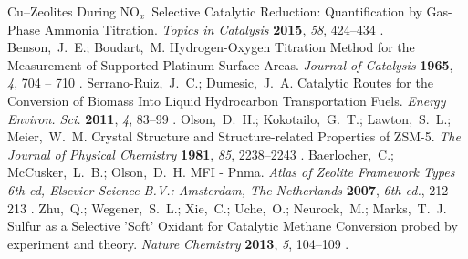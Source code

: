 \documentclass[journal=iecred,manuscript=article]{achemso}
\begin{document}
{\begin{mcitethebibliography}
  Cu--Zeolites During NO$_x$\  Selective Catalytic Reduction: Quantification by
  Gas-Phase Ammonia Titration. \emph{Topics in Catalysis} \textbf{2015},
  \emph{58}, 424--434\relax
\mciteBstWouldAddEndPuncttrue
\mciteSetBstMidEndSepPunct{\mcitedefaultmidpunct}
{\mcitedefaultendpunct}{\mcitedefaultseppunct}\relax
\unskip.
Benson,~J.~E.; Boudart,~M. Hydrogen-Oxygen Titration Method for the Measurement
  of Supported Platinum Surface Areas. \emph{Journal of Catalysis}
  \textbf{1965}, \emph{4}, 704 -- 710\relax
\mciteBstWouldAddEndPuncttrue
\mciteSetBstMidEndSepPunct{\mcitedefaultmidpunct}
{\mcitedefaultendpunct}{\mcitedefaultseppunct}\relax
\unskip.
Serrano-Ruiz,~J.~C.; Dumesic,~J.~A. Catalytic Routes for the Conversion of
  Biomass Into Liquid Hydrocarbon Transportation Fuels. \emph{Energy Environ.
  Sci.} \textbf{2011}, \emph{4}, 83--99\relax
\mciteBstWouldAddEndPuncttrue
\mciteSetBstMidEndSepPunct{\mcitedefaultmidpunct}
{\mcitedefaultendpunct}{\mcitedefaultseppunct}\relax
\unskip.
Olson,~D.~H.; Kokotailo,~G.~T.; Lawton,~S.~L.; Meier,~W.~M. Crystal Structure
  and Structure-related Properties of ZSM-5. \emph{The Journal of Physical
  Chemistry} \textbf{1981}, \emph{85}, 2238--2243\relax
\mciteBstWouldAddEndPuncttrue
\mciteSetBstMidEndSepPunct{\mcitedefaultmidpunct}
{\mcitedefaultendpunct}{\mcitedefaultseppunct}\relax
\unskip.
Baerlocher,~C.; McCusker,~L.~B.; Olson,~D.~H. MFI - Pnma. \emph{Atlas of
  Zeolite Framework Types 6th ed, Elsevier Science B.V.: Amsterdam, The
  Netherlands} \textbf{2007}, \emph{6th ed.}, 212--213\relax
\mciteBstWouldAddEndPuncttrue
\mciteSetBstMidEndSepPunct{\mcitedefaultmidpunct}
{\mcitedefaultendpunct}{\mcitedefaultseppunct}\relax
\unskip.
Zhu,~Q.; Wegener,~S.~L.; Xie,~C.; Uche,~O.; Neurock,~M.; Marks,~T.~J. {Sulfur
  as a Selective 'Soft' Oxidant for Catalytic Methane Conversion probed by
  experiment and theory}. \emph{{Nature Chemistry}} \textbf{{2013}},
  \emph{{5}}, {104--109}\relax
\mciteBstWouldAddEndPuncttrue
\mciteSetBstMidEndSepPunct{\mcitedefaultmidpunct}
{\mcitedefaultendpunct}{\mcitedefaultseppunct}\relax
\unskip.

\end{mcitethebibliography}}
\end{document}
